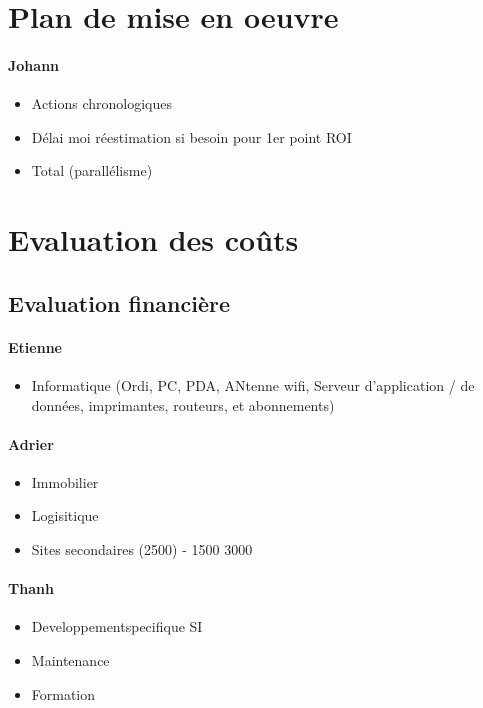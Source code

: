 \section{Plan de mise en oeuvre}
    \paragraph{Johann}
    \begin{itemize}
        \item Actions chronologiques
        \item Délai
            \subitem moi réestimation si besoin pour 1er point ROI
        \item Total (parallélisme)
    \end{itemize}

\section{Evaluation des coûts}

    \subsection{Evaluation financière}
        \paragraph{Etienne}
        \begin{itemize}
            \item Informatique (Ordi, PC, PDA, ANtenne wifi, Serveur d'application / de données, imprimantes, routeurs, et abonnements)
        \end{itemize}
        
        \paragraph{Adrier}
        \begin{itemize}
            \item Immobilier
            \item Logisitique
            \item Sites secondaires (2500) - 1500 3000
        \end{itemize}
        
        \paragraph{Thanh}
        \begin{itemize}
            \item Developpementspecifique SI
            \item Maintenance
            \item Formation
        \end{itemize}

